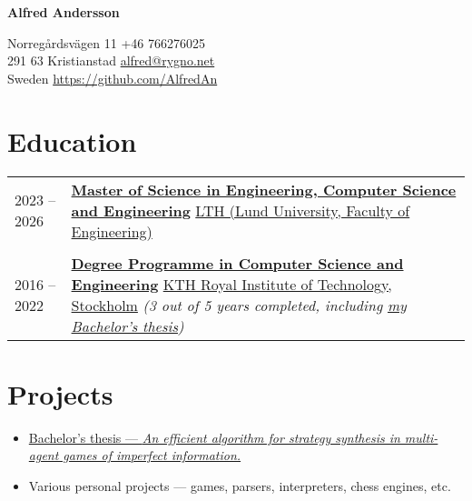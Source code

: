 \documentclass[11pt]{article}
\begin{document}
\begin{center}
     \Huge{\textbf{Alfred Andersson}}
\end{center}
Norregårdsvägen 11 \hfill +46 766276025 \\
291 63 Kristianstad \hfill \href{mailto:alfred@rygno.net}{alfred@rygno.net} \\ 
Sweden \hfill \url{https://github.com/AlfredAn}

\section{Education}
\begin{tabular}{ l p{405pt} }
    2023 -- 2026 & \href{https://www.lth.se/utbildning/datateknik300/}{\textbf{Master of Science in Engineering, Computer Science and Engineering}}
    \newline \href{https://www.lth.se/english/}{LTH (Lund University, Faculty of Engineering)} \\ \\

    2016 -- 2022 & \href{https://www.kth.se/utbildning/civilingenjor/datateknik}{\textbf{Degree Programme in Computer Science and Engineering}}
    \newline \href{https://www.kth.se/en}{KTH Royal Institute of Technology, Stockholm}
    \newline \textit{(3 out of 5 years completed, including \href{https://kth.diva-portal.org/smash/record.jsf?pid=diva2\%3A1701708\&dswid=-199}{my Bachelor's thesis})}
\end{tabular}

\section{Projects}
\begin{itemize}
    \item \href{https://kth.diva-portal.org/smash/record.jsf?pid=diva2\%3A1701708\&dswid=-199}{Bachelor's thesis --- \textit{An efficient algorithm for strategy synthesis in multi-agent games of imperfect information.}}
    \item Various personal projects --- games, parsers, interpreters, chess engines, etc.
\end{itemize}
\end{document}

